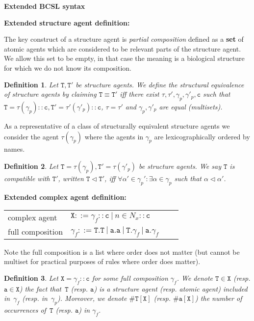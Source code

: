 \documentclass[12pt]{article}
\newtheorem{mydef}{Definition}
\newcommand{\mysection}[1]{{\newpage\centering\Large\textbf{#1}\\}\normalsize\vspace{0.5cm}}
\newcommand{\mysmallsection}[1]{\vspace{0.5cm}\large\textbf{#1}\normalsize\vspace{0.5cm}}
\begin{document}
\mysection{Extended BCSL syntax}

\mysmallsection{Extended structure agent definition:}

The key construct of a structure agent is \emph{partial composition} defined as a \textbf{set} of atomic agents which are considered to be relevant parts of the structure agent. We allow this set to be empty, in that case the meaning is a biological structure for which we do not know its composition.

\begin{mydef}
Let $\mathtt{T},\mathtt{T}'$ be structure agents. We define the \emph{structural equivalence of structure agents} by claiming $\mathtt{T}\equiv\mathtt{T}'$ iff there exist $\tau,\tau',\gamma_p,\gamma'_p,\mathtt{c}$ such that $\mathtt{T}=\tau(\gamma_p)::\mathtt{c},\mathtt{T}'=\tau'(\gamma'_p)::\mathtt{c}$, $\tau=\tau'$ and $\gamma_p,\gamma'_p$ are equal (multisets).
\end{mydef}

As a representative of a class of structurally equivalent structure agents we consider the agent $\mathtt{\tau}(\gamma_p)$ where the agents in $\gamma_p$ are lexicographically ordered by names.

\begin{mydef}
Let $\mathtt{T} = \tau(\gamma_p),\mathtt{T}' = \tau(\gamma'_p)$ be structure agents. We say $\mathtt{T}$ \emph{is compatible with} $\mathtt{T}'$, written $\mathtt{T} \lhd \mathtt{T}'$, iff $\forall \alpha' \in \gamma_p': \exists \alpha \in \gamma_p$ such that $\alpha \lhd \alpha'$. 
\end{mydef}

\mysmallsection{Extended complex agent definition:}

\begin{center}
{\small
\hspace*{-1 cm}\begin{tabular}{ ll ll }
 complex agent & $\mathtt{X}::=\gamma_f::\mathtt{c}~|~n\in{N}_{x}::\mathtt{c}$\\
 full composition & $\gamma_f ::= \mathtt{T}.\mathtt{T}~|~\mathtt{a}.\mathtt{a}~|~\mathtt{T}.\gamma_{f}~|~\mathtt{a}.\gamma_{f}$
\end{tabular}
}
\end{center}

Note the full composition is a list where order does not matter (but cannot be multiset for practical purposes of rules where order does matter).

\begin{mydef}
Let $\mathtt{X}=\gamma_f::\mathtt{c}$ for some full composition $\gamma_f$. We denote $\mathtt{T}\in \mathtt{X}$ (resp. $\mathtt{a}\in \mathtt{X}$) the fact that~$\mathtt{T}$ (resp. $\mathtt{a}$) is a structure agent (resp. atomic agent) included in~$\gamma_f$ (resp. in~$\gamma_p$). 
Moreover, we denote $\#\mathtt{T}[\mathtt{X}]$ (resp. $\#\mathtt{a}[\mathtt{X}]$) the number of occurrences of~$\mathtt{T}$ (resp. $\mathtt{a}$) in $\gamma_f$. 
\end{mydef}
\end{document}
